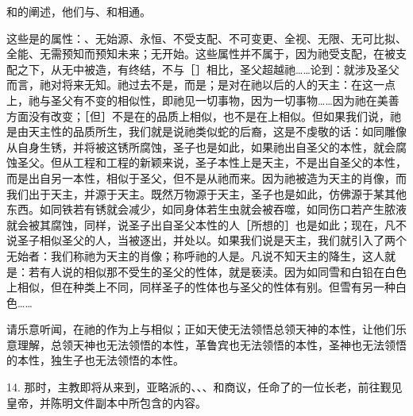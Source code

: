 和的阐述，他们与、和相通。\par

这些是的属性：、无始源、永恒、不受支配、不可变更、全视、无限、无可比拟、全能、无需预知而预知未来；无开始。这些属性并不属于，因为祂受支配，在被支配之下，从无中被造，有终结，不与［］相比，圣父超越祂……论到：就涉及圣父而言，祂对将来无知。祂过去不是，而是；是对在祂以后的人的天主：在这一点上，祂与圣父有不变的相似性，即祂见一切事物，因为一切事物……因为祂在美善方面没有改变；［但］不是在的品质上相似，也不是在上相似。但如果我们说，祂是由天主性的品质所生，我们就是说祂类似蛇的后裔，这是不虔敬的话：如同雕像从自身生锈，并将被这锈所腐蚀，圣子也是如此，如果祂出自圣父的本性，就会腐蚀圣父。但从工程和工程的新颖来说，圣子本性上是天主，不是出自圣父的本性，而是出自另一本性，相似于圣父，但不是从祂而来。因为祂被造为天主的肖像，而我们出于天主，并源于天主。既然万物源于天主，圣子也是如此，仿佛源于某其他东西。如同铁若有锈就会减少，如同身体若生虫就会被吞噬，如同伤口若产生脓液就会被其腐蚀，同样，说圣子出自圣父本性的人［所想的］也是如此；现在，凡不说圣子相似圣父的人，当被逐出，并处以。如果我们说是天主，我们就引入了两个无始者：我们称祂为天主的肖像；称呼祂的人是。凡说不知天主的降生，这人就是：若有人说的相似那不受生的圣父的性体，就是亵渎。因为如同雪和白铅在白色上相似，但在种类上不同，同样圣子的性体也与圣父的性体有别。但雪有另一种白色……\par

请乐意听闻，在祂的作为上与相似；正如天使无法领悟总领天神的本性，让他们乐意理解，总领天神也无法领悟的本性，革鲁宾也无法领悟的本性，圣神也无法领悟的本性，独生子也无法领悟的本性。\par

14. 那时，主教即将从来到，亚略派的、、、和商议，任命了的一位长老，前往觐见皇帝，并陈明文件副本中所包含的内容。\par

